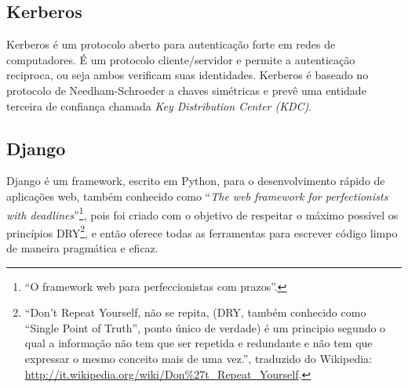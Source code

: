 \subsection{Kerberos}
Kerberos é um protocolo aberto para autenticação forte em redes de
computadores. É um protocolo cliente/servidor e permite a autenticação
reciproca, ou seja ambos verificam suas identidades. Kerberos é
baseado no protocolo de Needham-Schroeder a chaves simétricas e prevê
uma entidade terceira de confiança chamada \emph{Key Distribution
  Center (KDC)}.
 
\subsection{Django}\label{Django}
Django é um framework, escrito em Python, para o desenvolvimento
rápido de aplicações web, também conhecido como ``\emph{The web
  framework for perfectionists with deadlines}''\footnote{``O
  framework web para perfeccionistas com prazos''.}, pois foi criado
com o objetivo de respeitar o máximo possível os princípios
DRY\footnote{``Don't Repeat Yourself, não se repita, (DRY, também
  conhecido como ``Single Point of Truth'', ponto único de verdade) é
  um principio segundo o qual a informação não tem que ser repetida e
  redundante e não tem que expressar o mesmo conceito mais de uma
  vez.'', traduzido do Wikipedia:
  \url{http://it.wikipedia.org/wiki/Don\%27t_Repeat_Yourself}.}, e
então oferece todas as ferramentas para escrever código limpo de
maneira pragmática e eficaz.

